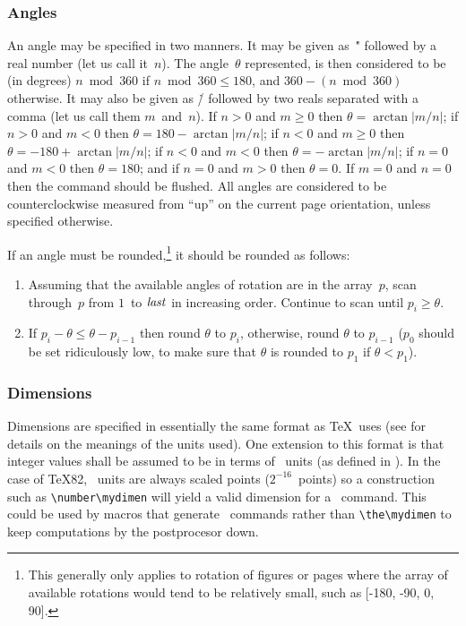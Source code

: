 \subsubsection{Angles}\label{sec:angle}
An angle may be specified in two manners. It may be given as~\." followed
by a real number (let us call it~$n$). The angle~$\theta$ represented,
is then considered to be (in degrees) $n \bmod 360$ if
$n \bmod 360\le180$, and $360-(n \bmod 360)$ otherwise. It may also
be given as \./ followed by two reals separated with a comma (let us
call them $m$~and~$n$). If $n>0$ and $m\ge0$ then
$\theta=\arctan\left|m/n\right|$; if $n>0$ and $m<0$ then
$\theta=180-\arctan\left|m/n\right|$; if $n<0$ and $m\ge0$ then
$\theta=-180+\arctan\left|m/n\right|$; if $n<0$ and $m<0$ then
$\theta=-\arctan\left|m/n\right|$; if $n=0$ and $m<0$ then $\theta=180$;
and if $n=0$ and $m>0$ then $\theta=0$. If $m=0$ and $n=0$ then the
command should be flushed.
All angles are considered to be counterclockwise measured from ``up''
on the current page orientation, unless specified otherwise.

If an angle must be rounded,\footnote{This generally only applies to
rotation of figures or pages where the array of available rotations
would tend to be relatively small, such as [-180, -90, 0, 90].} it should
be rounded as follows:
\begin{enumerate}
\item Assuming that the available angles of rotation are in the
         array~$p$, scan through~$p$ from $1$~to $\it last$ in increasing
         order. Continue to scan until $p_i\ge\theta$.
\item If $p_i-\theta\le\theta-p_{i-1}$ then round $\theta$ to $p_i$,
         otherwise, round $\theta$ to $p_{i-1}$ ($p_0$ should be set
         ridiculously low, to make sure that $\theta$ is rounded to $p_1$
         if $\theta<p_1$).
\end{enumerate}

\subsubsection{Dimensions}
Dimensions are specified in essentially the same format as \TeX\ uses
(see \cite[Chapter~10]{knuth:texbook} for details on the meanings of
the units used). One extension to this format is that integer values
shall be assumed to be in terms of \DVI~units (as defined in
\cite[\S13--20]{ware:dvitype}). In the case of \TeX82, \DVI~units are
always scaled points ($2^{-16}$~points) so a construction such as
\verb|\number\mydimen| will yield a valid dimension for a \Special\
command. This could be used by macros that generate \Special\ commands
rather than \verb|\the\mydimen| to keep computations by the postprocesor
down.

